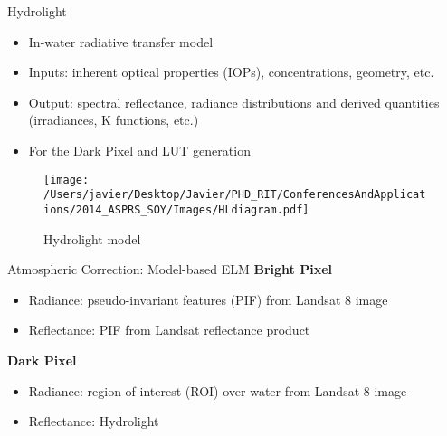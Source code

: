 \documentclass{beamer}
\begin{document}
\begin{frame}{}
\begin{columns}[t]
\begin{column}{.3\linewidth}
\begin{block}{Hydrolight}
\small
\begin{itemize}
  \item In-water radiative transfer model
  \vspace{0.5cm}
  \item Inputs: inherent optical properties (IOPs), concentrations, geometry, etc.
  \vspace{0.5cm}
  \item Output: spectral reflectance, radiance distributions and derived quantities (irradiances, K functions, etc.)
  \vspace{0.5cm}
  \item For the Dark Pixel and LUT generation
\end{itemize}
\vspace{1cm}
\begin{figure}[H]
    \texttt{[image: /Users/javier/Desktop/Javier/PHD\_RIT/ConferencesAndApplications/2014\_ASPRS\_SOY/Images/HLdiagram.pdf]}
    \caption{Hydrolight model}
\end{figure}
\end{block}


\begin{block}{Atmospheric Correction: Model-based ELM}
{\large \bf Bright Pixel}
\begin{itemize}
    \item Radiance: pseudo-invariant features (PIF) from Landsat 8 image
    \vspace{0.5cm}
    \item Reflectance: PIF from Landsat reflectance product
\end{itemize}
\vspace{0.3cm}
{\large \bf Dark Pixel}

\begin{itemize}
    \item Radiance: region of interest (ROI) over water from Landsat 8 image
    \vspace{0.5cm}
    \item Reflectance: Hydrolight
\end{itemize}
\vspace{1cm}


\end{block}
\end{column}
\end{columns}
\end{frame}
\end{document}

